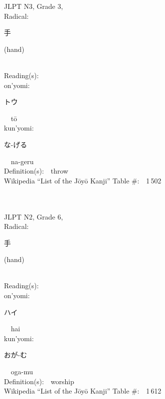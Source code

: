 \begin{multicols}{2}
{JLPT N3, Grade 3, \\Radical:\ \ {\begin{CJK}{UTF8}{min} 手 \end{CJK}} (hand) } \\
Reading(s):\ \ \\
{\hspace*{1em}}on'yomi:\ \ \\
{\hspace*{2em}}{\begin{CJK}{UTF8}{min} トウ \end{CJK}}\ \ t\=o\ \ \\
{\hspace*{1em}}kun'yomi:\ \ \\
{\hspace*{2em}}{\begin{CJK}{UTF8}{min} な-げる \end{CJK}}\ \ na-geru\ \ \\
Definition(s):\ \ throw \\
Wikipedia ``List of the J\=oy\=o Kanji'' Table \#:\ \ 1\,502 \\
\ \ \\
{\fontsize{34pt}{40pt}  }\ \ \\  %
{JLPT N2, Grade 6, \\Radical:\ \ {\begin{CJK}{UTF8}{min} 手 \end{CJK}} (hand) } \\
Reading(s):\ \ \\
{\hspace*{1em}}on'yomi:\ \ \\
{\hspace*{2em}}{\begin{CJK}{UTF8}{min} ハイ \end{CJK}}\ \ hai\ \ \\
{\hspace*{1em}}kun'yomi:\ \ \\
{\hspace*{2em}}{\begin{CJK}{UTF8}{min} おが-む \end{CJK}}\ \ oga-mu\ \ \\
Definition(s):\ \ worship \\
Wikipedia ``List of the J\=oy\=o Kanji'' Table \#:\ \ 1\,612 \\

\end{multicols}
